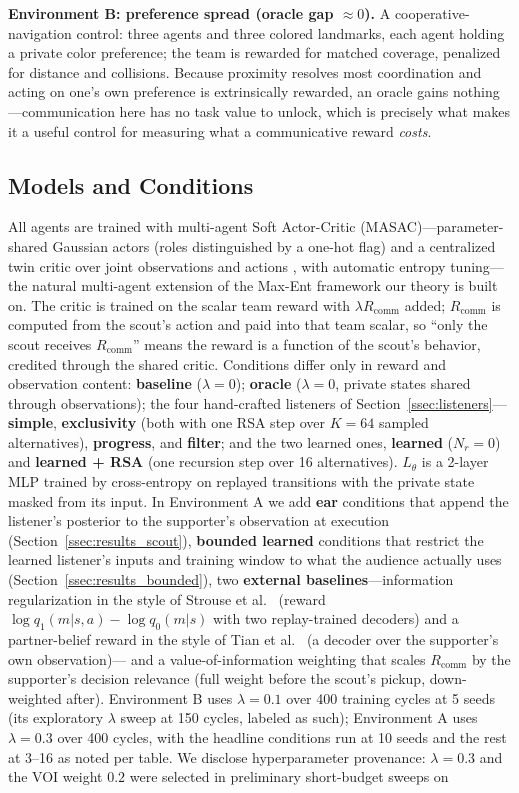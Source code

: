 \documentclass{article}
\newcommand{\Rcomm}{R_{\text{comm}}}
\newcommand{\Ltheta}{L_\theta}
\begin{document}
\textbf{Environment B: preference spread (oracle gap $\approx 0$).} A cooperative-navigation control: three agents and three colored landmarks, each agent holding a private color preference; the team is rewarded for matched coverage, penalized for distance and collisions. Because proximity resolves most coordination and acting on one's own preference is extrinsically rewarded, an oracle gains nothing---communication here has no task value to unlock, which is precisely what makes it a useful control for measuring what a communicative reward \emph{costs}.

\subsection{Models and Conditions}
\label{ssec:models}

All agents are trained with multi-agent Soft Actor-Critic (MASAC)---parameter-shared Gaussian actors (roles distinguished by a one-hot flag) and a centralized twin critic over joint observations and actions \cite{lowe2017multi}, with automatic entropy tuning---the natural multi-agent extension of the Max-Ent framework our theory is built on. The critic is trained on the scalar team reward with $\lambda\Rcomm$ added; $\Rcomm$ is computed from the scout's action and paid into that team scalar, so ``only the scout receives $\Rcomm$'' means the reward is a function of the scout's behavior, credited through the shared critic. Conditions differ only in reward and observation content: \textbf{baseline} ($\lambda=0$); \textbf{oracle} ($\lambda=0$, private states shared through observations); the four hand-crafted listeners of Section~\ref{ssec:listeners}---\textbf{simple}, \textbf{exclusivity} (both with one RSA step over $K=64$ sampled alternatives), \textbf{progress}, and \textbf{filter}; and the two learned ones, \textbf{learned} ($N_r=0$) and \textbf{learned + RSA} (one recursion step over 16 alternatives). $\Ltheta$ is a 2-layer MLP trained by cross-entropy on replayed transitions with the private state masked from its input. In Environment A we add \textbf{ear} conditions that append the listener's posterior to the supporter's observation at execution (Section~\ref{ssec:results_scout}), \textbf{bounded learned} conditions that restrict the learned listener's inputs and training window to what the audience actually uses (Section~\ref{ssec:results_bounded}), two \textbf{external baselines}---information regularization in the style of Strouse et al.~\cite{strouse2018learning} (reward $\log q_1(m|s,a) - \log q_0(m|s)$ with two replay-trained decoders) and a partner-belief reward in the style of Tian et al.~\cite{tian2020implicit} (a decoder over the supporter's own observation)--- and a value-of-information weighting that scales $\Rcomm$ by the supporter's decision relevance (full weight before the scout's pickup, down-weighted after). Environment B uses $\lambda=0.1$ over 400 training cycles at 5 seeds (its exploratory $\lambda$ sweep at 150 cycles, labeled as such); Environment A uses $\lambda=0.3$ over 400 cycles, with the headline conditions run at 10 seeds and the rest at 3--16 as noted per table. We disclose hyperparameter provenance: $\lambda=0.3$ and the VOI weight $0.2$ were selected in preliminary short-budget sweeps on 
\end{document}
